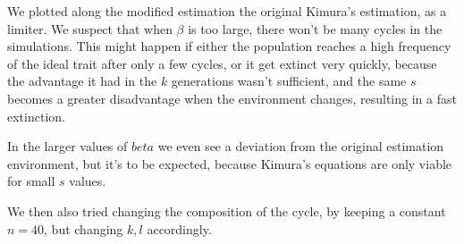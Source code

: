 \documentclass[11pt]{article}
\begin{document}
We plotted along the modified estimation the original Kimura's estimation, as a limiter. We suspect that when $\beta$ is too large, there won't be many cycles in the simulations. This might happen if either the population reaches a high frequency of the ideal trait after only a few cycles, or it get extinct very quickly, because the advantage it had in the $k$ generations wasn't sufficient, and the same $s$ becomes a greater disadvantage when the environment changes, resulting in a fast extinction.

In the larger values of $beta$ we even see a deviation from the original estimation environment, but it's to be expected, because Kimura's equations are only viable for small $s$ values.

We then also tried changing the composition of the cycle, by keeping a constant $n=40$, but changing $k,l$ accordingly.
\end{document}
